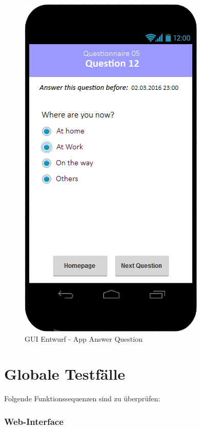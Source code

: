 \documentclass[a4paper]{scrreprt}
\begin{document}
            \vspace*{1cm}
	        \begin{figure}[ht]
                \centering
                \includegraphics[scale = 0.3]{android_answer.jpg}
                \caption{GUI Entwurf - App Answer Question}
            \end{figure}

    \chapter{Globale Testfälle}

        Folgende Funktionssequenzen sind zu \"uberpr\"ufen:

        \subsection{Web-Interface}
\end{document}
